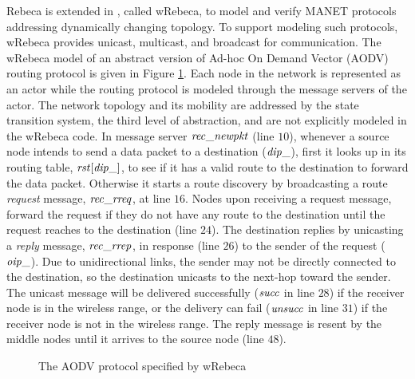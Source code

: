 Rebeca is extended in \cite{FOAC}, called wRebeca, to model and verify %
MANET protocols addressing dynamically changing topology. To support modeling such protocols, wRebeca provides unicast, multicast, and broadcast for communication. The wRebeca model of an abstract version of Ad-hoc On Demand Vector (AODV) routing protocol \cite{AODV} is given in Figure \ref{code:aodv}. Each node in the network is represented as an actor while the routing protocol
is modeled through the message servers of the actor. The network topology and its mobility are addressed by the state transition system, the third level of abstraction, and are not explicitly modeled in the wRebeca code.  
%
In message server ${\it rec\_newpkt}$ (line $10$),
whenever a source node intends to send a data packet to a destination (${\it dip\_}$), %
first it looks up in its routing table, ${\it rst}[{\it dip\_}]$, to see if it has a valid route to the destination to forward the data packet. Otherwise it starts a route discovery by broadcasting a route \emph{request} message, ${\it rec\_rreq}$, at line $16$. 
%
Nodes upon receiving a request message, forward the request if they do not have any route to the destination until the request reaches to the destination (line $24$). The destination replies by unicasting a \emph{reply} message, ${\it rec\_rrep}$, in response (line $26$) to the sender of the request (${\it oip\_}$). Due to unidirectional links, the sender may not be directly connected to the destination, so the destination unicasts to the next-hop toward the sender. The unicast message will be delivered
successfully ($\it succ$ in line $28$) if the receiver node is in the wireless range, or the
delivery can fail ($\it unsucc$ in line $31$) if the receiver node is not in the wireless range. The reply message is resent by the middle nodes until it arrives to the source node (line $48$).

\begin{figure}
	\begin{center}
		
	\end{center}
	\caption{The AODV protocol specified by wRebeca \label{code:aodv}\cite{FOAC}}
\end{figure} 

